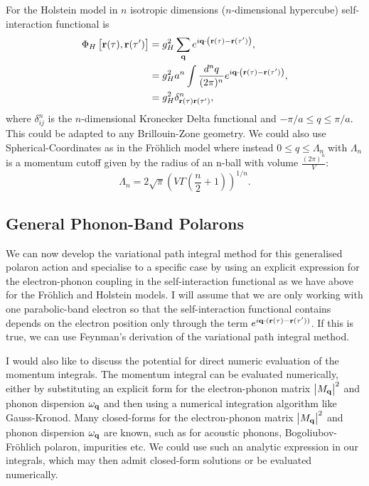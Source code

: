For the Holstein model in $n$ isotropic dimensions ($n$-dimensional hypercube) self-interaction functional is 
\begin{equation}
    \begin{aligned}
        \Phi_H\left[\vb{r}(\tau), \vb{r}(\tau')\right] &= g_H^2 \sum_{\vb{q}} e^{i \vb{q} \cdot \left(\vb{r}(\tau) - \vb{r}(\tau') \right)} ,\\
        &= g_{H}^2 a^n \int \frac{d^n q}{(2\pi)^n} e^{i\vb{q}\cdot\left(\vb{r}(\tau) - \vb{r}(\tau')\right)}, \\
        &= g_H^2 \delta^n_{\vb{r}(\tau)\vb{r}(\tau')} ,
    \end{aligned}
\end{equation}
where $\delta^n_{ij}$ is the $n$-dimensional Kronecker Delta functional and $-\pi/a
\leq q \leq \pi/a$. This could be adapted to any Brillouin-Zone geometry. We could also use Spherical-Coordinates as in the Fr\"ohlich model where instead $0 \leq q \leq \Lambda_n$ with $\Lambda_n$ is a momentum cutoff given by the radius of an n-ball with volume $\frac{(2\pi)^n}{V}$:
\begin{equation}
    \Lambda_n = 2\sqrt{\pi} \left(V \Gamma\left(\frac{n}{2} + 1\right)\right)^{1/n}.
\end{equation}

\subsection{General Phonon-Band Polarons}

We can now develop the variational path integral method for this generalised polaron action and specialise to a specific case by using an explicit expression for the electron-phonon coupling in the self-interaction functional as we have above for the Fr\"ohlich and Holstein models. I will assume that we are only working with one parabolic-band electron so that the self-interaction functional contains depends on the electron position only through the term $e^{i \vb{q} \cdot (\vb{r}(\tau) - \vb{r}(\tau'))}$. If this is true, we can use Feynman's derivation of the variational path integral method.

I would also like to discuss the potential for direct numeric evaluation of the momentum integrals. The momentum integral can be evaluated numerically, either by substituting an explicit form for the electron-phonon matrix $\abs{M_{\vb{q}}}^2$ and phonon dispersion $\omega_{\vb{q}}$ and then using a numerical integration algorithm like Gauss-Kronod. Many closed-forms for the electron-phonon matrix $\abs{M_{\vb{q}}}^2$ and phonon dispersion $\omega_{\vb{q}}$ are known, such as for acoustic phonons, Bogoliubov-Fr\"ohlich polaron, impurities etc. We could use such an analytic expression in our integrals, which may then admit closed-form solutions or be evaluated numerically. 

